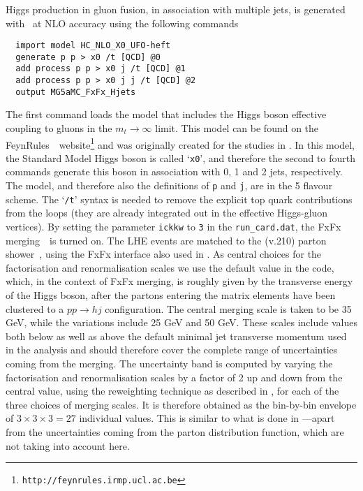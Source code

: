 \subsubsection{\MGaMC}
\label{sec:hjetscomp:tools:mc:mg5amc}

Higgs production in gluon fusion, in association with multiple jets,
is generated with \MGaMC \cite{Alwall:2014hca}~at NLO
accuracy using the following commands
\begin{verbatim}
  import model HC_NLO_X0_UFO-heft
  generate p p > x0 /t [QCD] @0
  add process p p > x0 j /t [QCD] @1
  add process p p > x0 j j /t [QCD] @2
  output MG5aMC_FxFx_Hjets
\end{verbatim}
The first command loads the model that includes the Higgs boson
effective coupling to gluons in the $m_t\to\infty$ limit. This model
can be found on the
FeynRules~\cite{Alloul:2013bka}~website\footnote{\texttt{http://feynrules.irmp.ucl.ac.be}}
and was originally created for the studies in
\cite{Demartin:2014fia}. In this model, the Standard Model Higgs
boson is called `\texttt{x0}', and therefore the second to fourth
commands generate this boson in association with 0, 1 and 2 jets,
respectively. The model, and therefore also the definitions of
\texttt{p} and \texttt{j}, are in the 5 flavour scheme. The
`\texttt{/t}' syntax is needed to remove the explicit top quark
contributions from the loops (they are already integrated out in the
effective Higgs-gluon vertices). By setting the parameter
\texttt{ickkw} to \texttt{3} in the \texttt{run\_card.dat}, the FxFx
merging~\cite{Frederix:2012ps}~is turned on. The LHE events are
matched to the  (v.210) parton
shower~\cite{Sjostrand:2014zea}, using the FxFx interface also used in
\cite{Frederix:2015eii}. As central choices for the factorisation
and renormalisation scales we use the default value in the
\MGaMC code, which, in the context of FxFx merging, is
roughly given by the transverse energy of the Higgs boson, after the
partons entering the matrix elements have been clustered to a $pp \to h
j$ configuration. The central merging scale is taken to be 35 GeV,
while the variations include 25 GeV and 50 GeV. These scales include 
values both below as well as above the default minimal jet transverse
momentum used in the analysis and should therefore cover the complete
range of uncertainties coming from the merging.  The uncertainty band
is computed by varying the factorisation and renormalisation scales by
a factor of 2 up and down from the central value, using the reweighting
technique as described in \cite{Frederix:2011ss}, for each of the
three choices of merging scales. It is therefore obtained
as the bin-by-bin envelope of $3 \times 3 \times 3 = 27$ individual
values. This is similar to what is done in
\cite{Frederix:2015eii}---apart from the uncertainties coming
from the parton distribution function, which are not taking into
account here.
